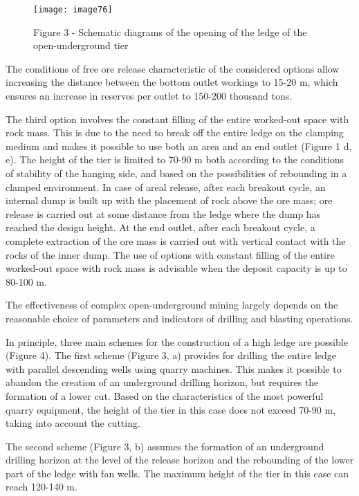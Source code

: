\begin{figure}[H]
    \centering
    \texttt{[image: image76]}
    \caption*{Figure 3 - Schematic diagrams of the opening of the ledge of the
open-underground tier}
\end{figure}

\begin{multicols}{2}
The conditions of free ore release characteristic of the considered
options allow increasing the distance between the bottom outlet workings
to 15-20 m, which ensures an increase in reserves per outlet to 150-200
thousand tons.

The third option involves the constant filling of the entire worked-out
space with rock mass. This is due to the need to break off the entire
ledge on the clamping medium and makes it possible to use both an area
and an end outlet (Figure 1 d, e). The height of the tier is limited to
70-90 m both according to the conditions of stability of the hanging
side, and based on the possibilities of rebounding in a clamped
environment. In case of areal release, after each breakout cycle, an
internal dump is built up with the placement of rock above the ore mass;
ore release is carried out at some distance from the ledge where the
dump has reached the design height. At the end outlet, after each
breakout cycle, a complete extraction of the ore mass is carried out
with vertical contact with the rocks of the inner dump. The use of
options with constant filling of the entire worked-out space with rock
mass is advisable when the deposit capacity is up to 80-100 m.

The effectiveness of complex open-underground mining largely depends on
the reasonable choice of parameters and indicators of drilling and
blasting operations.

In principle, three main schemes for the construction of a high ledge
are possible (Figure 4). The first scheme (Figure 3, a) provides for
drilling the entire ledge with parallel descending wells using quarry
machines. This makes it possible to abandon the creation of an
underground drilling horizon, but requires the formation of a lower cut.
Based on the characteristics of the most powerful quarry equipment, the
height of the tier in this case does not exceed 70-90 m, taking into
account the cutting.

The second scheme (Figure 3, b) assumes the formation of an underground
drilling horizon at the level of the release horizon and the rebounding
of the lower part of the ledge with fan wells. The maximum height of the
tier in this case can reach 120-140 m.


\end{multicols}
